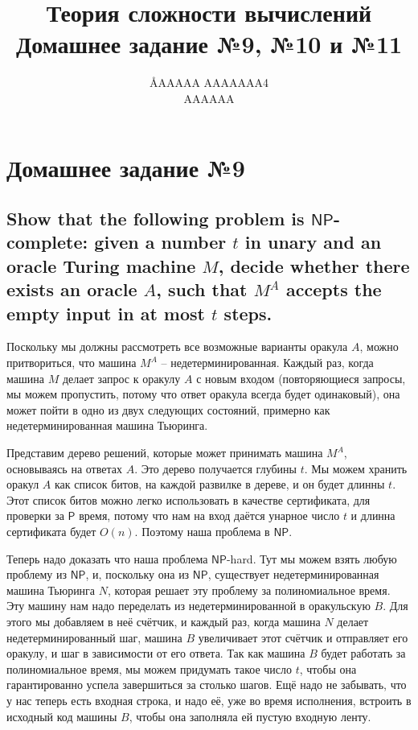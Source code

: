 \documentclass{article}
\title{Теория сложности вычислений \\ Домашнее задание №9, №10 и №11}
\author{\AA{AAAAA AAAAAAA}{4} \\ AAAAAA}
\newcommand{\NP}{\ensuremath{\mathsf{NP}}}
\renewcommand{\P}{\ensuremath{\mathsf{P}}}
\begin{document}
  \maketitle

  \setcounter{section}{8}
  \section{Домашнее задание №9}
  \setcounter{subsection}{8}
  \subsection{Show that the following problem is \NP-complete: given a number $t$ in unary and an oracle Turing machine $M$, decide whether there exists an oracle $A$, such that $M^A$ accepts the empty input in at most $t$ steps.}
  Поскольку мы должны рассмотреть все возможные варианты оракула $A$, можно притвориться, что машина $M^A$ -- недетерминированная.
  Каждый раз, когда машина $M$ делает запрос к оракулу $A$ с новым входом (повторяющиеся запросы, мы можем пропустить, потому что ответ оракула всегда будет одинаковый), она может пойти в одно из двух следующих состояний, примерно как недетерминированная машина Тьюринга.

  Представим дерево решений, которые может принимать машина $M^A$, основываясь на ответах $A$.
  Это дерево получается глубины $t$.
  Мы можем хранить оракул $A$ как список битов, на каждой развилке в дереве, и он будет длинны $t$.
  Этот список битов можно легко использовать в качестве сертификата, для проверки за \P{} время, потому что нам на вход даётся унарное число $t$ и длинна сертификата будет $O(n)$.
  Поэтому наша проблема в \NP.

  Теперь надо доказать что наша проблема \NP-hard.
  Тут мы можем взять любую проблему из \NP, и, поскольку она из \NP, существует недетерминированная машина Тьюринга $N$, которая решает эту проблему за полиномиальное время.
  Эту машину нам надо переделать из недетерминированной в оракульскую $B$.
  Для этого мы добавляем в неё счётчик, и каждый раз, когда машина $N$ делает недетерминированный шаг, машина $B$ увеличивает этот счётчик и отправляет его оракулу, и шаг в зависимости от его ответа.
  Так как машина $B$ будет работать за полиномиальное время, мы можем придумать такое число $t$, чтобы она гарантированно успела завершиться за столько шагов.
  Ещё надо не забывать, что у нас теперь есть входная строка, и надо её, уже во время исполнения, встроить в исходный код машины $B$, чтобы она заполняла ей пустую входную ленту.
\end{document}
